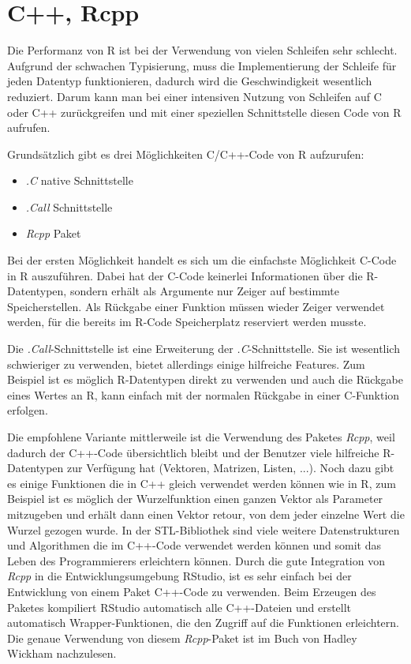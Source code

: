 \section{C++, Rcpp}
\label{sec:Rcpp}
Die Performanz von R ist bei der Verwendung von vielen Schleifen sehr schlecht. Aufgrund der schwachen Typisierung, muss die Implementierung der Schleife für jeden Datentyp funktionieren, dadurch wird die Geschwindigkeit wesentlich reduziert. Darum kann man bei einer intensiven Nutzung von Schleifen auf C oder C++ zurückgreifen und mit einer speziellen Schnittstelle diesen Code von R aufrufen.

Grundsätzlich gibt es drei Möglichkeiten C/C++-Code von R aufzurufen:
\begin{itemize}
	\item \emph{.C} native Schnittstelle
	\item \emph{.Call} Schnittstelle
	\item \emph{Rcpp} Paket
\end{itemize}

Bei der ersten Möglichkeit handelt es sich um die einfachste Möglichkeit C-Code in R auszuführen. Dabei hat der C-Code keinerlei Informationen über die R-Datentypen, sondern erhält als Argumente nur Zeiger auf bestimmte Speicherstellen. Als Rückgabe einer Funktion müssen wieder Zeiger verwendet werden, für die bereits im R-Code Speicherplatz reserviert werden musste.

Die \emph{.Call}-Schnittstelle ist eine Erweiterung der \emph{.C}-Schnittstelle. Sie ist wesentlich schwieriger zu verwenden, bietet allerdings einige hilfreiche Features. Zum Beispiel ist es möglich R-Datentypen direkt zu verwenden und auch die Rückgabe eines Wertes an R, kann einfach mit der normalen Rückgabe in einer C-Funktion erfolgen. \cite{wickham2015r}

Die empfohlene Variante mittlerweile ist die Verwendung des Paketes \emph{Rcpp}, weil dadurch der C++-Code übersichtlich bleibt und der Benutzer viele hilfreiche R-Datentypen zur Verfügung hat (Vektoren, Matrizen, Listen, ...). Noch dazu gibt es einige Funktionen die in C++ gleich verwendet werden können wie in R, zum Beispiel ist es möglich der Wurzelfunktion einen ganzen Vektor als Parameter mitzugeben und erhält dann einen Vektor retour, von dem jeder einzelne Wert die Wurzel gezogen wurde. In der STL-Bibliothek sind viele weitere Datenstrukturen und Algorithmen die im C++-Code verwendet werden können und somit das Leben des Programmierers erleichtern können. Durch die gute Integration von \emph{Rcpp} in die Entwicklungsumgebung RStudio, ist es sehr einfach bei der Entwicklung von einem Paket C++-Code zu verwenden. Beim Erzeugen des Paketes kompiliert RStudio automatisch alle C++-Dateien und erstellt automatisch Wrapper-Funktionen, die den Zugriff auf die Funktionen erleichtern. Die genaue Verwendung von diesem \emph{Rcpp}-Paket ist im Buch von Hadley Wickham nachzulesen. \cite{wickham2015advanced}

